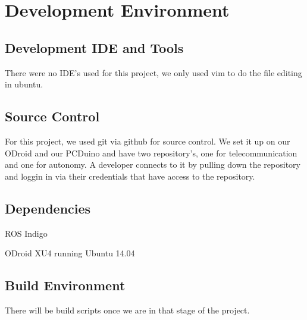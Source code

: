 \chapter{Development Environment}


\section{Development IDE and Tools}
There were no IDE's used for this project, we only used vim to do the file editing in ubuntu.

\section{Source  Control}
For this project, we used git via github for source control. We set it up on our ODroid and our PCDuino and have two repository's, one for telecommunication and one for autonomy. A developer connects to it by pulling down the repository and loggin in via their credentials that have access to the repository. 

\section{Dependencies}
\hspace{ 5mm}ROS Indigo


ODroid XU4 running Ubuntu 14.04

\section{Build  Environment}
There will be build scripts once we are in that stage of the project.
